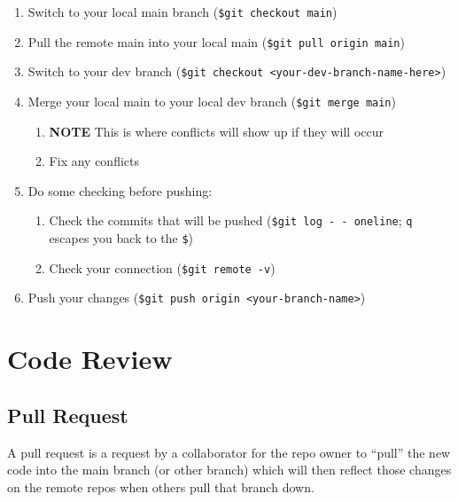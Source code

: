 \documentclass[
  letterpaper,
  DIV=11,
  numbers=noendperiod]{scrreprt}
\providecommand{\tightlist}{%
  \setlength{\itemsep}{0pt}\setlength{\parskip}{0pt}}\usepackage{longtable,booktabs,array}
\begin{document}
\begin{enumerate}
\def\labelenumi{\arabic{enumi}.}
\tightlist
\item
  Switch to your local main branch (\texttt{\$git\ checkout\ main})\\
\item
  Pull the remote main into your local main
  (\texttt{\$git\ pull\ origin\ main})\\
\item
  Switch to your dev branch
  (\texttt{\$git\ checkout\ \textless{}your-dev-branch-name-here\textgreater{}})\\
\item
  Merge your local main to your local dev branch
  (\texttt{\$git\ merge\ main})

  \begin{enumerate}
  \def\labelenumii{\alph{enumii}.}
  \tightlist
  \item
    \textbf{NOTE} This is where conflicts will show up if they will
    occur\\
  \item
    Fix any conflicts
  \end{enumerate}
\item
  Do some checking before pushing:

  \begin{enumerate}
  \def\labelenumii{\alph{enumii}.}
  \tightlist
  \item
    Check the commits that will be pushed
    (\texttt{\$git\ log\ -\ -\ oneline}; \texttt{q} escapes you back to
    the \texttt{\$})\\
  \item
    Check your connection (\texttt{\$git\ remote\ -v})\\
  \end{enumerate}
\item
  Push your changes
  (\texttt{\$git\ push\ origin\ \textless{}your-branch-name\textgreater{}})
\end{enumerate}

\section{Code Review}\label{code-review}

\subsection{Pull Request}\label{pull-request}

A pull request is a request by a collaborator for the repo owner to
``pull'' the new code into the main branch (or other branch) which will
then reflect those changes on the remote repos when others pull that
branch down.
\end{document}
